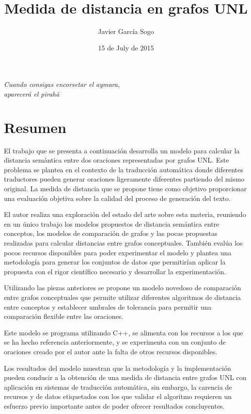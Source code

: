 \documentclass[a4paper,12pt,spanish]{book}
\title{Medida de distancia en grafos UNL}
\date{15 de July de 2015}
\author{Javier García Sogo}
\begin{document}
\maketitle
\tableofcontents
{}\label{index::doc}

\cleardoublepage
\chapter*{}
\begin{flushright}
\textit{Cuando consigas encorsetar el aymara,\\ aparecerá el pirahã}
\end{flushright}\cleardoublepage
\chapter*{Resumen}
El trabajo que se presenta a continuación desarrolla un modelo para calcular la distancia
semántica entre dos oraciones representadas por grafos UNL. Este problema se plantea
en el contexto de la traducción automática donde diferentes traductores pueden generar
oraciones ligeramente diferentes partiendo del mismo original. La medida de distancia que
se propone tiene como objetivo proporcionar una evaluación objetiva sobre la calidad del
proceso de generación del texto.

El autor realiza una exploración del estado del arte sobre esta materia, reuniendo en un
único trabajo los modelos propuestos de distancia semántica entre conceptos, los modelos de
comparación de grafos y las pocas propuestas realizadas para calcular distancias entre
grafos conceptuales. También evalúa los pocos recursos disponibles para poder experimentar
el modelo y plantea una metodología para generar los conjuntos de datos que permitirían
aplicar la propuesta con el rigor científico necesario y desarrollar la experimentación.

Utilizando las piezas anteriores se propone un modelo novedoso de comparación entre grafos
conceptuales que permite utilizar diferentes algoritmos de distancia entre conceptos y
establecer umbrales de tolerancia para permitir una comparación flexible entre las oraciones.

Este modelo se programa utilizando C++, se alimenta con los recursos a los que se ha
hecho referencia anteriormente, y se experimenta con un conjunto de oraciones creado por el
autor ante la falta de otros recursos disponibles.

Los resultados del modelo muestran que la metodología y la implementación pueden conducir a
la obtención de una medida de distancia entre grafos UNL con aplicación en sistemas de
traducción automática, sin embargo, la carencia de recursos y de datos etiquetados con
los que validar el algoritmo requieren un esfuerzo previo importante antes de poder ofrecer
resultados concluyentes.
\cleardoublepage
\end{document}
